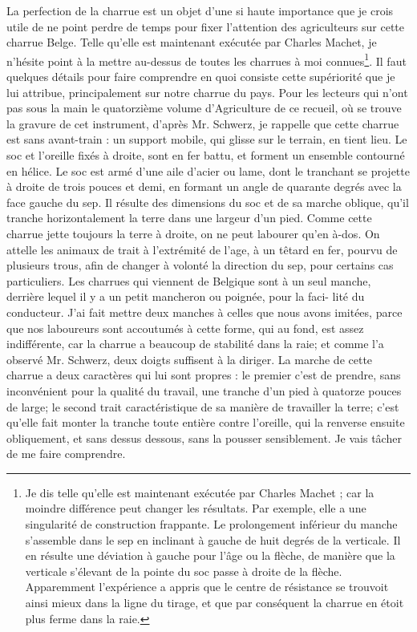 La perfection de la charrue est un objet d'une si haute importance que je crois utile de ne point perdre de temps pour fixer l'attention des agriculteurs sur cette charrue Belge. Telle qu'elle est maintenant exécutée par Charles Machet, je n'hésite point à la mettre au-dessus de toutes les charrues à moi connues\footnote{Je dis telle qu'elle est maintenant exécutée par Charles Machet ; car la moindre différence peut changer les résultats. Par exemple, elle a une singularité de construction frappante. Le prolongement inférieur du manche s'assemble dans le sep en inclinant à gauche de huit degrés de la verticale. Il en résulte une déviation à gauche pour l'âge ou la flèche, de manière que la verticale s'élevant de la pointe du soc passe à droite de la flèche. Apparemment l'expérience a appris que le centre de résistance se trouvoit ainsi mieux dans la ligne du tirage, et que par conséquent la charrue en étoit plus ferme dans la raie.}. Il faut quelques détails pour faire\setcounter{page}{363} comprendre en quoi consiste cette supériorité que je lui attribue, principalement sur notre charrue du pays. Pour les lecteurs qui n'ont pas sous la main le quatorzième volume d'Agriculture de ce recueil, où se trouve la gravure de cet instrument, d'après Mr. Schwerz, je rappelle que cette charrue est sans avant-train : un support mobile, qui glisse sur le terrain, en tient lieu. Le soc et l'oreille fixés à droite, sont en fer battu, et forment un ensemble contourné en hélice. Le soc est armé d'une aile d'acier ou lame, dont le tranchant se projette à droite de trois pouces et demi, en formant un angle de quarante degrés avec la face gauche du sep. Il résulte des dimensions du soc et de sa marche oblique, qu'il tranche horizontalement la terre dans une largeur d'un pied. Comme cette charrue jette toujours la terre à droite, on ne peut labourer qu'en à-dos. On attelle les animaux de trait à l'extrémité de l'age, à un têtard en fer, pourvu de plusieurs trous, afin de changer à volonté la direction du sep, pour certains cas particuliers.
Les charrues qui viennent de Belgique sont à un seul manche, derrière lequel il y a un petit mancheron ou poignée, pour la faci-\setcounter{page}{364} lité du conducteur. J'ai fait mettre deux manches à celles que nous avons imitées, parce que nos laboureurs sont accoutumés à cette forme, qui au fond, est assez indifférente, car la charrue a beaucoup de stabilité dans la raie; et comme l'a observé Mr. Schwerz, deux doigts suffisent à la diriger.
La marche de cette charrue a deux caractères qui lui sont propres : le premier c'est de prendre, sans inconvénient pour la qualité du travail, une tranche d'un pied à quatorze pouces de large; le second trait caractéristique de sa manière de travailler la terre; c'est qu'elle fait monter la tranche toute entière contre l'oreille, qui la renverse ensuite obliquement, et sans dessus dessous, sans la pousser sensiblement. Je vais tâcher de me faire comprendre.

